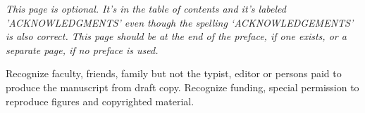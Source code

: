 {\footnotesize\em This page is optional.
It's in the table of contents and it's labeled 'ACKNOWLEDGMENTS' even
though the spelling `ACKNOWLEDGEMENTS' is also correct.
This page should be at the end of the preface, if one exists, or a
separate page, if no preface is used.}

Recognize faculty, friends, family but not the typist, editor or persons
paid to produce the manuscript from draft copy. Recognize funding,
special permission to reproduce figures and copyrighted material.
